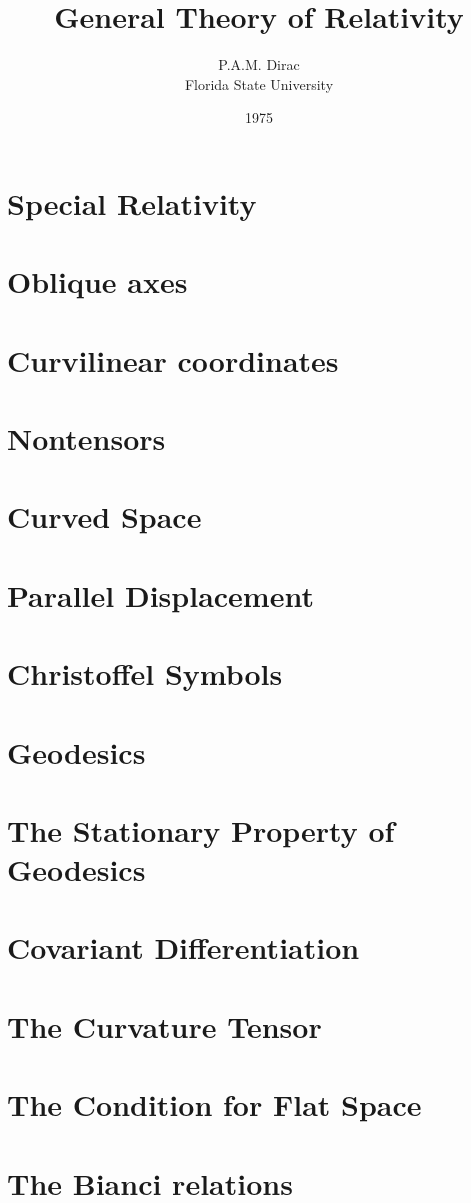 \documentclass[10pt]{book}
\title{General Theory of Relativity}
\author{P.A.M. Dirac\\Florida State University}
\date{1975}
\begin{document}
\maketitle
\chapter{Special Relativity}

\chapter{Oblique axes}

\chapter{Curvilinear coordinates}

\chapter{Nontensors}

\chapter{Curved Space}

\chapter{Parallel Displacement}

\chapter{Christoffel Symbols}

\chapter{Geodesics}

\chapter{The Stationary Property of Geodesics}

\chapter{Covariant Differentiation}

\chapter{The Curvature Tensor}

\chapter{The Condition for Flat Space}

\chapter{The Bianci relations}

\end{document}
